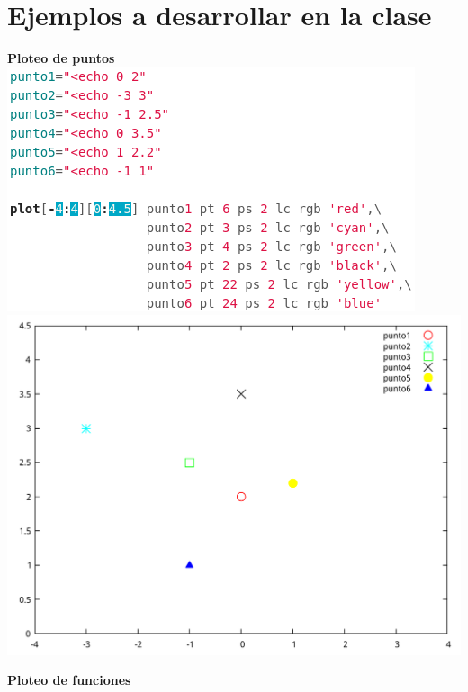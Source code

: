\documentclass[11.5pt,a4paper]{article}
\begin{document}
\section{Ejemplos a desarrollar en la clase}
\vspace{1.0cm}

\textbf{Ploteo de puntos}\\

\includegraphics[scale=0.50]{screen1.png} 
\includegraphics[scale=0.40]{ejemplo1.pdf}

\newpage 
\textbf{Ploteo de funciones}\\
 
\end{document}
